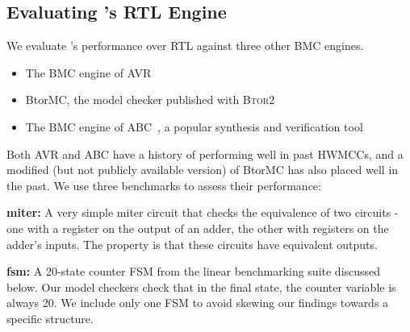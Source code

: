 \documentclass[acmsmall,screen,review]{acmart}
\begin{document}

\subsection{Evaluating \toolname{}'s RTL Engine}
\label{sec:bmc-eval}

We evaluate \toolname{}'s performance over RTL against three other BMC engines.
\begin{itemize}
  \item{The BMC engine of AVR~\cite{avr}}
  \item{BtorMC, the model checker published with B\textsc{tor}2~\cite{btor2}}
  \item{The BMC engine of ABC~\cite{abc}, a popular synthesis and verification tool}
\end{itemize}

Both AVR and ABC have a history of performing well in past HWMCCs, and a modified (but not publicly available version) of BtorMC has also placed well in the past.
We use three benchmarks to assess their performance:

\textbf{miter:} A very simple miter circuit that checks the equivalence of two circuits - one with a register on the output of an adder, the other with registers on the adder's inputs.
The property is that these circuits have equivalent outputs.

\textbf{fsm:} A 20-state counter FSM from the linear benchmarking suite
discussed below. Our model checkers check that in the final state, the counter variable is
always 20. We include only one FSM to avoid skewing our findings towards a specific structure.
\end{document}
